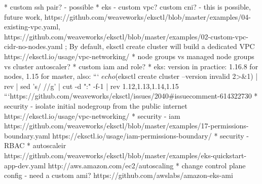 * custom ssh pair? - possible
* eks - custom vpc? custom cni? - this is possible, future work, https://github.com/weaveworks/eksctl/blob/master/examples/04-existing-vpc.yaml, https://github.com/weaveworks/eksctl/blob/master/examples/02-custom-vpc-cidr-no-nodes.yaml ; By default, eksctl create cluster will build a dedicated VPC https://eksctl.io/usage/vpc-networking/
* node groups vs managed node groups vs cluster autoscaler?
* custom iam and role?
* eks: version in practice: 1.16.8 for nodes, 1.15 for master, also:
```
$ echo $(eksctl create cluster --version invalid 2>&1) | rev | sed 's/ //g' | cut -d ":" -f-1 | rev
1.12,1.13,1.14,1.15
```https://github.com/weaveworks/eksctl/issues/2040#issuecomment-614322730
* security - isolate initial nodegroup from the public internet https://eksctl.io/usage/vpc-networking/
* security - iam https://github.com/weaveworks/eksctl/blob/master/examples/17-permissions-boundary.yaml https://eksctl.io/usage/iam-permissions-boundary/
* security - RBAC
* autoscaleir https://github.com/weaveworks/eksctl/blob/master/examples/eks-quickstart-app-dev.yaml http://aws.amazon.com/ec2/autoscaling
* change control plane config - need a custom ami? https://github.com/awslabs/amazon-eks-ami



